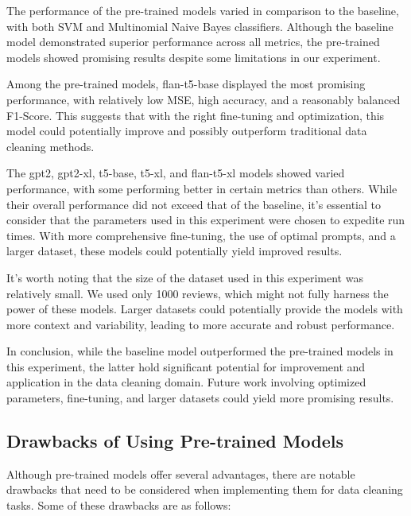 \documentclass{article}
\begin{document}
The performance of the pre-trained models varied in comparison to the baseline, with both SVM and Multinomial Naive Bayes classifiers. Although the baseline model demonstrated superior performance across all metrics, the pre-trained models showed promising results despite some limitations in our experiment.

Among the pre-trained models, flan-t5-base displayed the most promising performance, with relatively low MSE, high accuracy, and a reasonably balanced F1-Score. This suggests that with the right fine-tuning and optimization, this model could potentially improve and possibly outperform traditional data cleaning methods.

The gpt2, gpt2-xl, t5-base, t5-xl, and flan-t5-xl models showed varied performance, with some performing better in certain metrics than others. While their overall performance did not exceed that of the baseline, it's essential to consider that the parameters used in this experiment were chosen to expedite run times. With more comprehensive fine-tuning, the use of optimal prompts, and a larger dataset, these models could potentially yield improved results.

It's worth noting that the size of the dataset used in this experiment was relatively small. We used only 1000 reviews, which might not fully harness the power of these models. Larger datasets could potentially provide the models with more context and variability, leading to more accurate and robust performance.

In conclusion, while the baseline model outperformed the pre-trained models in this experiment, the latter hold significant potential for improvement and application in the data cleaning domain. Future work involving optimized parameters, fine-tuning, and larger datasets could yield more promising results.

\subsection{Drawbacks of Using Pre-trained Models}

Although pre-trained models offer several advantages, there are notable drawbacks that need to be considered when implementing them for data cleaning tasks. Some of these drawbacks are as follows:
\end{document}
